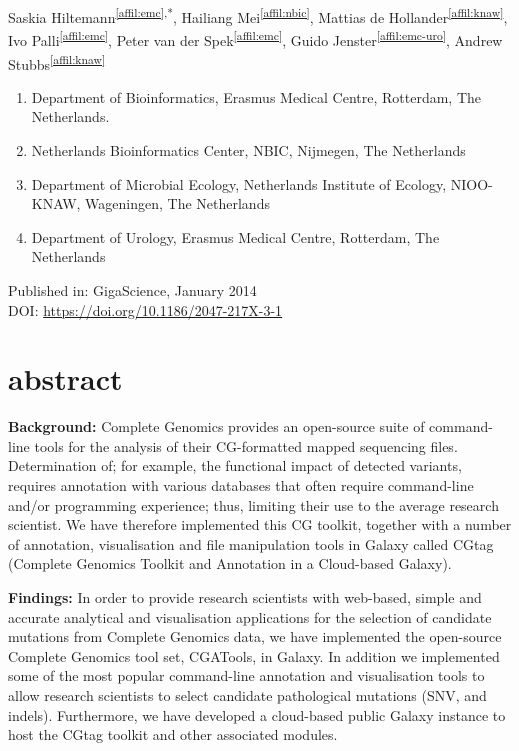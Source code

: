 \setcounter{NAT@ctr}{-1}

Saskia Hiltemann\textsuperscript{\ref{affil:emc},*},
Hailiang Mei\textsuperscript{\ref{affil:nbic}},
Mattias de Hollander\textsuperscript{\ref{affil:knaw}},
Ivo Palli\textsuperscript{\ref{affil:emc}},
Peter van der Spek\textsuperscript{\ref{affil:emc}},
Guido Jenster\textsuperscript{\ref{affil:emc-uro}},
Andrew Stubbs\textsuperscript{\ref{affil:knaw}}

\small
\begin{enumerate}
\itemsep-0.5em
\item Department of Bioinformatics, Erasmus Medical Centre, Rotterdam, The Netherlands.\label{affil:emc}
\item Netherlands Bioinformatics Center, NBIC, Nijmegen, The Netherlands\label{affil:nbic}
\item Department of Microbial Ecology, Netherlands Institute of Ecology, NIOO-KNAW, Wageningen, The Netherlands\label{affil:knaw}
\item Department of Urology, Erasmus Medical Centre, Rotterdam,  The Netherlands\label{affil:emc-uro}
\end{enumerate}
\normalsize

Published in: GigaScience, January 2014 \\
DOI: \url{https://doi.org/10.1186/2047-217X-3-1}

\section*{abstract}

\textbf{Background:} Complete Genomics provides an open-source suite of command-line tools for the analysis of their CG-formatted mapped sequencing files. Determination of; for example, the functional impact of detected variants, requires annotation with various databases that often require command-line and/or programming experience; thus, limiting their use to the average research scientist. We have therefore implemented this CG toolkit, together with a number of annotation, visualisation and file manipulation tools in Galaxy called CGtag (Complete Genomics Toolkit and Annotation in a Cloud-based Galaxy).


\textbf{Findings:} In order to provide research scientists with web-based, simple and accurate analytical and visualisation applications for the selection of candidate mutations from Complete Genomics data, we have implemented the open-source Complete Genomics tool set, CGATools, in Galaxy. In addition we implemented some of the most popular command-line annotation and visualisation tools to allow research scientists to select candidate pathological mutations (SNV, and indels). Furthermore, we have developed a cloud-based public Galaxy instance to host the CGtag toolkit and other associated modules.

